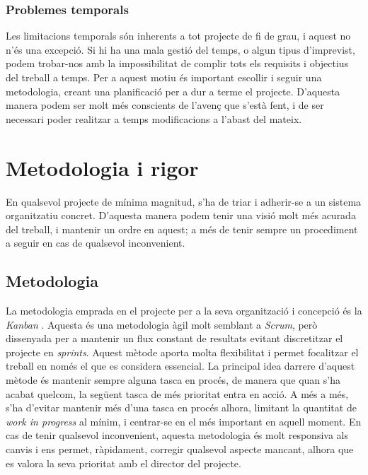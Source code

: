 \documentclass[a4paper]{report}
\begin{document}
	\subsubsection{Problemes temporals}
	Les limitacions temporals són inherents a tot projecte de fi de grau, i aquest no n'és una excepció. Si hi ha una mala gestió del temps, o algun tipus d'imprevist, podem trobar-nos amb la impossibilitat de complir tots els requisits i objectius del treball a temps. \newline
	Per a aquest motiu és important escollir i seguir una metodologia, creant una planificació per a dur a terme el projecte. D'aquesta manera podem ser molt més conscients de l'avenç que s'està fent, i de ser necessari poder realitzar a temps modificacions a l'abast del mateix.
	
	\section{Metodologia i rigor}
	En qualsevol projecte de mínima magnitud, s'ha de triar i adherir-se a un sistema organitzatiu concret. D'aquesta manera podem tenir una visió molt més acurada del treball, i mantenir un ordre en aquest; a més de tenir sempre un procediment a seguir en cas de qualsevol inconvenient.
	\subsection{Metodologia}
	La metodologia emprada en el projecte per a la seva organització i concepció és la \textit{Kanban} \cite{Anderson2010}. Aquesta és una metodologia àgil molt semblant a \textit{Scrum}, però dissenyada per a mantenir un flux constant de resultats evitant discretitzar el projecte en \textit{sprints}. Aquest mètode aporta molta flexibilitat i permet focalitzar el treball en només el que es considera essencial.
	\newline
	La principal idea darrere d'aquest mètode és mantenir sempre alguna tasca en procés, de manera que quan s'ha acabat quelcom, la següent tasca de més prioritat entra en acció. A més a més, s'ha d'evitar mantenir més d'una tasca en procés alhora, limitant la quantitat de \textit{work in progress} al mínim, i centrar-se en el més important en aquell moment.
	\newline
	En cas de tenir qualsevol inconvenient, aquesta metodologia és molt responsiva als canvis i ens permet, ràpidament, corregir qualsevol aspecte mancant, alhora que es valora la seva prioritat amb el director del projecte.
	
\end{document}

